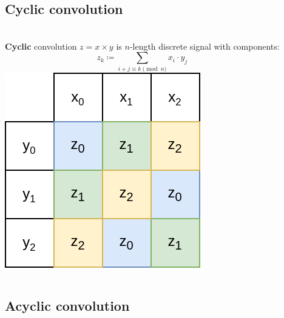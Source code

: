 \documentclass{beamer}
\begin{document}
\subsection{Cyclic convolution}

\begin{frame}
		\frametitle{\secname}
		\framesubtitle{\subsecname}

 		\begin{columns}
				\textbf{Cyclic} convolution $z = x \times y$ is $n$-length discrete
				signal with components:
				\[
						z_k \coloneqq \sum_{i + j \equiv k \pmod{n}} x_i \cdot y_j
				\]
 				\includegraphics[width=\textwidth]{../resources/cyclic_convolution.drawio.png}
		\end{columns}
\end{frame}

\subsection{Acyclic convolution}
\end{document}
